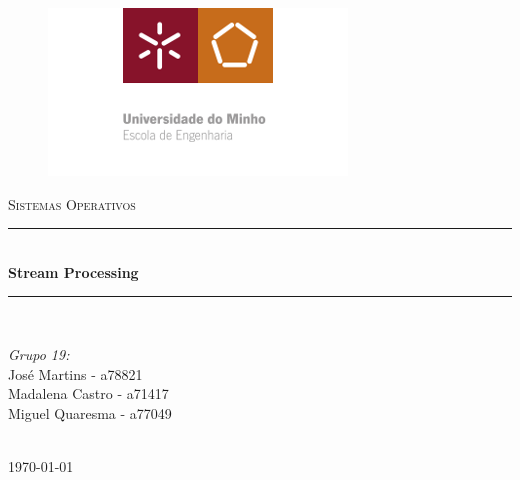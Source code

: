 \documentclass[12pt]{article}
\begin{document}

\begin{titlepage}

\newcommand{\HRule}{\rule{\linewidth}{0.5mm}} 
\center
\begin{figure}[ht!]
	\centering
	\includegraphics[scale=3]{DI.png}
\end{figure}

\textsc{\large Sistemas Operativos}\\[0.5cm] 
\HRule \\[0.4cm]
{ \huge \bfseries Stream Processing}\\[0.4cm] 
\HRule \\[1.5cm]


\begin{center} \large
\emph{Grupo 19:}\\
José Martins - a78821\\
Madalena Castro - a71417\\
Miguel Quaresma - a77049\\
\end{center}

\begin{minipage}{0.4\textwidth}
\end{minipage}\\[4cm]

{\large \today}\\[3cm] 
\vfill
\end{titlepage}


\tableofcontents 

\newpage

\end{document}
